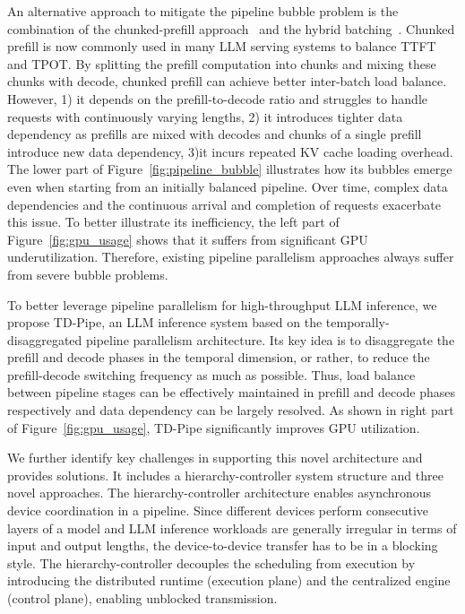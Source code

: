 An alternative approach to mitigate the pipeline bubble problem is the combination of the chunked-prefill approach~\cite{agrawal2024taming} and the hybrid batching~\cite{yu2022orca}. 
Chunked prefill is now commonly used in many LLM serving systems to balance TTFT and TPOT.
By splitting the prefill computation into chunks and mixing these chunks with decode, chunked prefill can achieve better inter-batch load balance.
However, 1) it depends on the prefill-to-decode ratio and struggles to handle requests with continuously varying lengths, 2) it introduces tighter data dependency as prefills are mixed with decodes and chunks of a single prefill introduce new data dependency, 3)it incurs repeated KV cache loading overhead.
The lower part of Figure~\ref{fig:pipeline_bubble} illustrates how its bubbles emerge even when starting from an initially balanced pipeline.
Over time, complex data dependencies and the continuous arrival and completion of requests exacerbate this issue.
To better illustrate its inefficiency, the left part of Figure~\ref{fig:gpu_usage} shows that it suffers from significant GPU underutilization.
Therefore, existing pipeline parallelism approaches always suffer from severe bubble problems.

To better leverage pipeline parallelism for high-throughput LLM inference, we propose TD-Pipe, an LLM inference system based on the temporally-disaggregated pipeline parallelism architecture. Its key idea is to disaggregate the prefill and decode phases in the temporal dimension, or rather, to reduce the prefill-decode switching frequency as much as possible.
Thus, load balance between pipeline stages can be effectively maintained in prefill and decode phases respectively and data dependency can be largely resolved.
As shown in right part of Figure~\ref{fig:gpu_usage}, TD-Pipe significantly improves GPU utilization.


We further identify key challenges in supporting this novel architecture and provides solutions.
It includes a hierarchy-controller system structure and three novel approaches.
The hierarchy-controller architecture enables asynchronous device coordination in a pipeline.
Since different devices perform consecutive layers of a model and LLM inference workloads are generally irregular in terms of input and output lengths, the device-to-device transfer has to be in a blocking style.
The hierarchy-controller decouples the scheduling from execution by introducing the distributed runtime (execution plane) and the centralized engine (control plane), enabling unblocked transmission.

